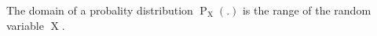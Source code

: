 The domain of a probality distribution $\operatorname{P}_{\operatorname{X}} (.)$ is the range of the random variable $\operatorname{X}$.
